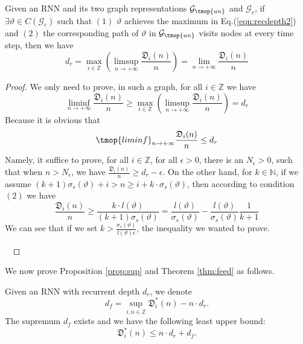 \begin{proposition}
\label{prop:assump}
  Given an RNN and its two graph representations $\mathcal{G}_{\tmop{un}}$ and
  $\mathcal{G}_c$, if $\exists \vartheta \in C (\mathcal{G}_c)$ such that
  $(1)$ $\vartheta$ achieves the maximum in Eq.(\ref{eqn:recdepth2}) and $(2)$
  the corresponding path of $\vartheta$ in $\mathcal{G}_{\tmop{un}}$ visits nodes at every time step,
  then we have
  \[ d_r = \max_{i \in \mathbb{Z}} \left( \limsup_{n \rightarrow + \infty}
     \frac{\mathfrak{D}_i (n)}{n} \right) = \lim_{n \rightarrow + \infty}
     \frac{\mathfrak{D}_i (n)}{n} \]
\end{proposition}

\begin{proof}
  We only need to prove, in such a graph, for all $i \in \mathbb{Z}$ we have
  \[ \liminf_{n \rightarrow + \infty} \frac{\mathfrak{D}_i (n)}{n} \geq
     \max_{i \in \mathbb{Z}} \left( \limsup_{n \rightarrow + \infty}
     \frac{\mathfrak{D}_i (n)}{n} \right) = d_r \]
  Because it is obvious that
  \[ \tmop{liminf}_{n \rightarrow + \infty} \frac{\mathfrak{D}_i (n)}{n} \leq
     d_r \]
  Namely, it suffice to prove, for all $i \in \mathbb{Z}$, for all $\epsilon
  > 0$, there is an $N_{\epsilon} > 0$, such that when $n > N_{\epsilon}$, we
  have $\frac{\mathfrak{D}_i (n)}{n} \geq d_r - \epsilon$. On the other hand,
  for $k \in \mathbb{N}$, if we assume $(k + 1) \sigma_s (\vartheta) + i > n
  \geq i + k \cdot \sigma_s (\vartheta)$, then according to condition $(2)$ we
  have
  \[ \frac{\mathfrak{D}_i (n)}{n} \geq \frac{k \cdot l (\vartheta)}{(k + 1)
     \sigma_s (\vartheta)} = \frac{l (\vartheta)}{\sigma_s (\vartheta)} -
     \frac{l (\vartheta)}{\sigma_s (\vartheta)} \frac{1}{k + 1} \]
  We can see that if we set $k > \frac{\sigma_s (\vartheta)}{l (\vartheta)
  \epsilon}$, the inequality we wanted to prove.
  
  \ 
\end{proof}

We now prove Proposition \ref{prop:sup} and Theorem \ref{thm:feed} as follows.


\begin{proposition}
  Given an RNN with recurrent depth $d_r$, we denote
  \[ d_f = \sup_{i, n \in \mathbb{Z}} \mathfrak{D}_i^{\ast} (n) - n \cdot
     d_r. \]
  The supremum $d_f$ exists and we have the following least upper bound:
  \[ \mathfrak{D}_i^{\ast} (n) \leq n \cdot d_r + d_f. \]
\end{proposition}

